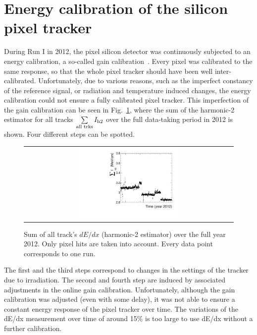 \section{Energy calibration of the silicon pixel tracker}
During Run I in 2012, the pixel silicon detector was continuously subjected to an energy calibration, a so-called gain calibration~\cite{bib:Danek}.
Every pixel was calibrated to the same response, so that the whole pixel tracker should have been well inter-calibrated.
Unfortunately, due to various reasons, such as the imperfect constancy of the reference signal, or radiation and temperature induced changes, the energy calibration could not ensure a fully calibrated pixel tracker.
This imperfection of the gain calibration can be seen in Fig.~\ref{fig:StabilityPlot_beforeCalibration}, where the sum of the harmonic-2 estimator for all tracks $\sum\limits_{\text{all trks}}I_{\text{h2}}$ over the full data-taking period in 2012 is shown.
Four different steps can be spotted.
\begin{figure}[!b]
  \centering 
  \begin{tabular}{c}
  \includegraphics[width=0.49\textwidth]{figures/analysis/PixelCalibration/StabilityPlot_Pixel_beforeCalibration_withoutStepFits_NEW.pdf}
  \end{tabular}
  \caption{Sum of all track's $dE/dx$ (harmonic-2 estimator) over the full year 2012. Only pixel hits are taken into account. Every data point corresponds to one run.} 
  \label{fig:StabilityPlot_beforeCalibration}
\end{figure}
The first and the third steps correspond to changes in the settings of the tracker due to irradiation.
The second and fourth step are induced by associated adjustments in the online gain calibration.
Unfortunately, although the gain calibration was adjusted (even with some delay), it was not able to ensure a constant energy response of the pixel tracker over time. 
The variations of the dE/dx measurement over time of around 15\% is too large to use dE/dx without a further calibration. 

